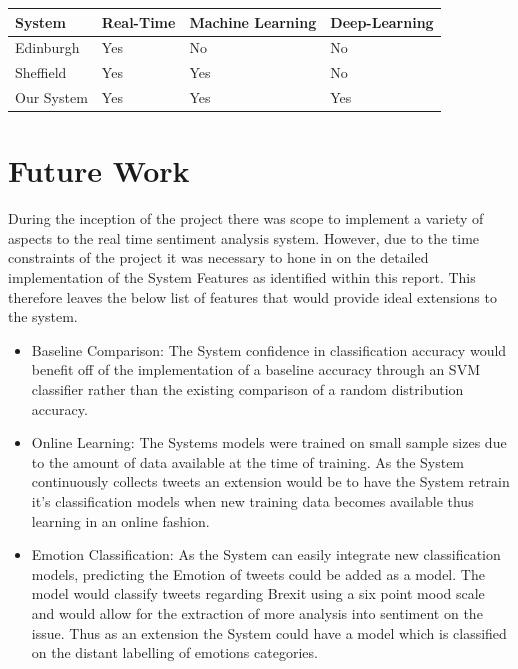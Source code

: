 \documentclass[11pt]{report}
\begin{document}
\begin{center}
\begin{tabular}{ |p{3cm}||p{2cm}|p{2cm}|p{2cm}|}
 \hline
 System & Real-Time & Machine Learning & Deep-Learning\\
 \hline
  Edinburgh & Yes & No & No \\
 \hline
 Sheffield & Yes & Yes & No \\
  \hline
 Our System & Yes & Yes & Yes \\
 \hline
\end{tabular}
\label{table:comparison}
\end{center}



\section{Future Work}
During the inception of the project there was scope to implement a variety of aspects to the real time sentiment analysis system. However, due to the time constraints of the project it was necessary to hone in on the detailed implementation of the System Features as identified within this report. This therefore leaves the below list of features that would provide ideal extensions to the system.

\begin{itemize}
\item Baseline Comparison: The System confidence in classification accuracy would benefit off of the implementation of a baseline accuracy through an SVM classifier rather than the existing comparison of a random distribution accuracy.

\item Online Learning: The Systems models were trained on small sample sizes due to the amount of data available at the time of training. As the System continuously collects tweets an extension would be to have the System retrain it's classification models when new training data becomes available thus learning in an online fashion.
 
\item Emotion Classification: As the System can easily integrate new classification models, predicting the Emotion of tweets could be added as a model. The model would classify tweets regarding Brexit using a six point mood scale \citep{pepe_between_2008} and would allow for the extraction of more analysis into sentiment on the issue. Thus as an extension the System could have a model which is classified on the distant labelling of emotions categories.
\end{itemize}
\end{document}
